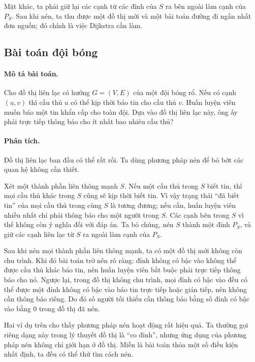 \documentclass[11pt]{article}
\begin{document}
Mặt khác, ta phải giữ lại các cạnh từ các đỉnh của $S$ ra bên ngoài làm cạnh
của $P_S$. Sau khi nén, ta thu được một đồ thị mới và một bài toán đường đi
ngắn nhất đơn nguồn; đó chính là việc Dijkstra cần làm.

\subsection{Bài toán đội bóng}

\paragraph{Mô tả bài toán.}
Cho đồ thị liên lạc có hướng $G=(V,E)$ của một đội bóng rổ. Nếu có cạnh
$(u,v)$ thì cầu thủ $u$ có thể kịp thời báo tin cho cầu thủ $v$. Huấn luyện
viên muốn báo một tin khẩn cấp cho toàn đội. Dựa vào đồ thị liên lạc này, ông
ấy phải trực tiếp thông báo cho ít nhất bao nhiêu cầu thủ?

\paragraph{Phân tích.}
Đồ thị liên lạc ban đầu có thể rất rối. Ta dùng phương pháp nén để bỏ bớt các
quan hệ không cần thiết.

Xét một thành phần liên thông mạnh $S$. Nếu một cầu thủ trong $S$ biết tin,
thì mọi cầu thủ khác trong $S$ cũng sẽ kịp thời biết tin. Vì vậy trạng thái
``đã biết tin'' của mọi cầu thủ trong cùng $S$ là tương đương; nếu cần, huấn
luyện viên nhiều nhất chỉ phải thông báo cho một người trong $S$. Các cạnh
bên trong $S$ vì thế không còn ý nghĩa đối với đáp án. Ta bỏ chúng, nén $S$
thành một đỉnh $P_S$, và giữ các cạnh liên lạc từ $S$ ra ngoài làm cạnh của
$P_S$.

Sau khi nén mọi thành phần liên thông mạnh, ta có một đồ thị mới không còn
chu trình. Khi đó bài toán trở nên rõ ràng: đỉnh không có bậc vào không thể
được cầu thủ khác báo tin, nên huấn luyện viên bắt buộc phải trực tiếp thông
báo cho nó. Ngược lại, trong đồ thị không chu trình, mọi đỉnh có bậc vào đều
có thể được một đỉnh không có bậc vào báo tin trực tiếp hoặc gián tiếp, nên
không cần thông báo riêng. Do đó số người tối thiểu cần thông báo bằng số
đỉnh có bậc vào bằng $0$ trong đồ thị đã nén.

Hai ví dụ trên cho thấy phương pháp nén hoạt động rất hiệu quả. Ta thường gọi
riêng dạng này trong lý thuyết đồ thị là ``co đỉnh'', nhưng ứng dụng của
phương pháp nén không chỉ giới hạn ở đồ thị. Miễn là bài toán thỏa một số
điều kiện nhất định, ta đều có thể thử tìm cách nén.
\end{document}
